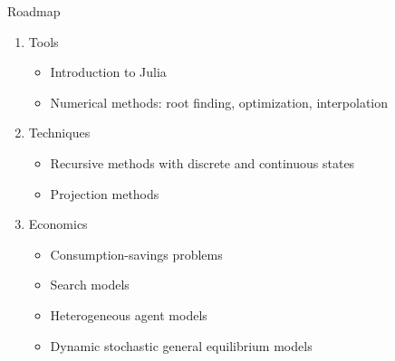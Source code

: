 \documentclass[11pt,xcolor={dvipsnames},aspectratio=159,hyperref={pdftex,pdfpagemode=UseNone,hidelinks,pdfdisplaydoctitle=true},usepdftitle=false]{beamer}
\begin{document}
    \begin{frame}{Roadmap}

\begin{enumerate}
    \item Tools
    \begin{itemize}
        \item Introduction to Julia
        \item Numerical methods: root finding, optimization, interpolation
    \end{itemize}

    \item Techniques
    \begin{itemize}
        \item Recursive methods with discrete and continuous states
        \item Projection methods
    \end{itemize}

    \item Economics
    \begin{itemize}
        \item Consumption-savings problems
        \item Search models
        \item Heterogeneous agent models
        \item Dynamic stochastic general equilibrium models
    \end{itemize}
\end{enumerate}
    
\end{frame}
\end{document}
